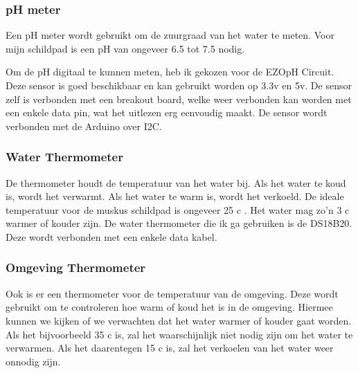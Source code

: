 \documentclass[a4paper]{report}
\begin{document}
\subsubsection{pH meter}
Een pH meter wordt gebruikt om de zuurgraad van het water te meten. 
Voor mijn schildpad is een pH van ongeveer 6.5 tot 7.5 nodig\cite{TheAquariumGuide}. 

Om de pH digitaal te kunnen meten, heb ik gekozen voor de  EZO\texttrademark \space pH Circuit. 
Deze sensor is goed beschikbaar en kan gebruikt worden op 3.3v en 5v. De sensor zelf is verbonden met een breakout board, welke weer verbonden kan worden met een enkele data pin, wat het uitlezen erg eenvoudig maakt.
De sensor wordt verbonden met de Arduino over I2C. 


\subsubsection{Water Thermometer}
De thermometer houdt de temperatuur van het water bij. Als het water te koud is, wordt het verwarmt. Als het water te warm is, wordt het verkoeld.
De ideale temperatuur voor de muskus schildpad is ongeveer 25 \textdegree c \cite{picard2011common}. Het water mag zo'n 3 \textdegree c warmer of kouder zijn.
De water thermometer die ik ga gebruiken is de DS18B20. Deze wordt verbonden met een enkele data kabel.

\subsubsection{Omgeving Thermometer}
Ook is er een thermometer voor de temperatuur van de omgeving. Deze wordt gebruikt om te controleren hoe warm of koud het is in de omgeving. Hiermee kunnen we kijken of we verwachten dat het water warmer of kouder gaat worden.
Als het bijvoorbeeld 35 \textdegree c is, zal het waarschijnlijk niet nodig zijn om het water te verwarmen. Als het daarentegen 15 \textdegree c is, zal het verkoelen van het water weer onnodig zijn.
\end{document}
